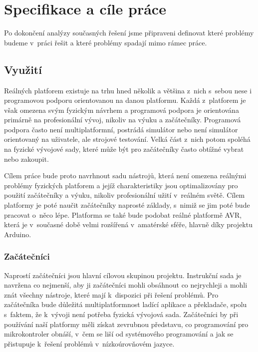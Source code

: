 \chapter{Specifikace a cíle práce}

Po dokončení analýzy současných řešení jsme připraveni definovat které pro\-blé\-my budeme v~práci řešit a které problémy spadají mimo rámec práce.

\section{Využití}

Reálných platforem existuje na trhu hned několik a většina z~nich s~sebou nese i programovou podporu orientovanou na danou platformu. Každá z~platforem je však omezena svým fyzickým návrhem a programová podpora je orientována primárně na profesionální vývoj, nikoliv na výuku a začátečníky. Programová podpora často není multiplatformní, postrádá simulátor nebo není simulátor orientovaný na uživatele, ale strojové testování. Velká část z~nich potom spoléhá na fyzické vývojové sady, které může být pro začátečníky často obtížné vybrat nebo zakoupit.

Cílem práce bude proto navrhnout sadu nástrojů, která není omezena reálnými problémy fyzických platforem a jejíž charakteristiky jsou optimalizovány pro použití začátečníky a výuku, nikoliv profesionální užití v~reálném světě. Cílem platformy je poté naučit začátečníky naprosté základy, s~nimiž se jim poté bude pracovat o~něco lépe. Platforma se také bude podobat reálné platformě AVR, která je v~současné době velmi rozšířená v~amatérské sféře, hlavně díky projektu Arduino.

\subsection{Začátečníci}

Naprostí začátečníci jsou hlavní cílovou skupinou projektu. Instrukční sada je navržena co nejmenší, aby ji začátečníci mohli obsáhnout co nejrychleji a mohli znát všechny nástroje, které mají k~dispozici při řešení problémů. Pro začátečníka bude důležitá multiplatformnost ladící aplikace a překladače, spolu s~faktem, že k~vývoji není potřeba fyzická vývojová sada. Začátečníci by při používání naší platformy měli získat zevrubnou představu, co programování pro mikrokontroler obnáší, v~čem se liší od systémového programování a jak se přistupuje k~řešení problémů v~nízkoúrovňovém jazyce.


